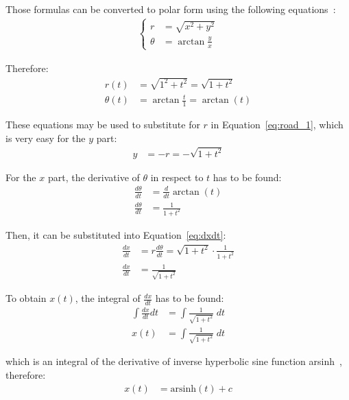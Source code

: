 \documentclass[12pt]{article}
\begin{document}
        Those formulas can be converted to polar form using the following equations~\cite{polar_rectangular}:
        \begin{align}
            \begin{cases}
                r &= \sqrt{x^2 + y^2} \\
                \theta &= \arctan\frac{y}{x}
            \end{cases}
        \end{align}

        Therefore:
        \begin{align}
            r(t) &= \sqrt{1^2 + t^2} = \sqrt{1+t^2} \\
            \theta(t) &= \arctan\frac{t}{1} = \arctan(t)
        \end{align}

        These equations may be used to substitute for $r$ in Equation~\ref{eq:road_1}, which is very easy for the $y$ part:
        \begin{align}
            y &= -r = -\sqrt{1+t^2}
        \end{align}

        For the $x$ part, the derivative of $\theta$ in respect to $t$ has to be found:
        \begin{align}
            \frac{d\theta}{dt} &= \frac{d}{dt} \arctan(t) \\
            \frac{d\theta}{dt} &= \frac{1}{1+t^2}
        \end{align}

        Then, it can be substituted into Equation~\ref{eq:dxdt}:
        \begin{align}
            \frac{dx}{dt} &= r \frac{d\theta}{dt} = \sqrt{1+t^2} \cdot \frac{1}{1+t^2} \\
            \frac{dx}{dt} &= \frac{1}{\sqrt{1+t^2}}
        \end{align}

        To obtain $x(t)$, the integral of $\frac{dx}{dt}$ has to be found:
        \begin{align}
            \int \frac{dx}{dt} dt &= \int \frac{1}{\sqrt{1+t^2}} \;dt \\
            x(t) &= \int \frac{1}{\sqrt{1+t^2}} \;dt
        \end{align}

        which is an integral of the derivative of inverse hyperbolic sine function arsinh~\cite{oxford_dict}, therefore:
        \begin{align}
            x(t) &= \text{arsinh}(t) + c 
        \end{align}
\end{document}
